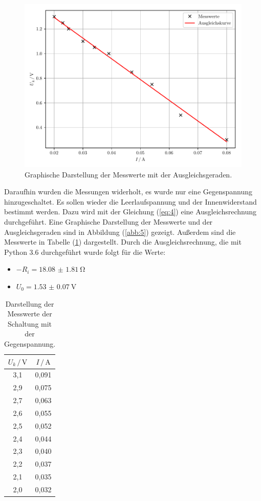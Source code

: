 \begin{figure}[H]
  \centering
  \includegraphics{plot1.pdf}
  \caption{Graphische Darstellung der Messwerte mit der Ausgleichsgeraden.}
  \label{abb:4}
\end{figure}

Daraufhin wurden die Messungen widerholt, es wurde nur eine Gegenspannung
hinzugeschaltet. Es sollen wieder die Leerlaufspannung und der Innenwiderstand bestimmt
werden. Dazu wird mit der Gleichung (\ref{eq:4}) eine Ausgleichsrechnung durchgeführt.
Eine Graphische Darstellung der Messwerte und der Ausgleichsgeraden sind in Abbildung (\ref{abb:5})
gezeigt. Außerdem sind die Messwerte in Tabelle (\ref{tab:2}) dargestellt.
Durch die Ausgleichsrechnung, die mit Python 3.6 durchgeführt wurde folgt für die Werte:

\begin{itemize}
  \item $-R_i = \SI{18.08(181)}{\ohm}$
  \item $U_0 = \SI{1.53(7)}{\volt}$
\end{itemize}

\begin{table}[H]
  \centering
  \caption{Darstellung der Messwerte der Schaltung mit der Gegenspannung.}
  \label{tab:2}
  \begin{tabular}{c c}
    \toprule
    $U_k \, / \, \si{\volt}$ & $ I \, / \, \si{\ampere}$ \\
    \midrule
    3,1 & 0,091 \\
    2,9 & 0,075 \\
    2,7 & 0,063 \\
    2,6 & 0,055 \\
    2,5 & 0,052 \\
    2,4 & 0,044 \\
    2,3 & 0,040 \\
    2,2 & 0,037 \\
    2,1 & 0,035 \\
    2,0 & 0,032 \\
    \bottomrule
  \end{tabular}
\end{table}

